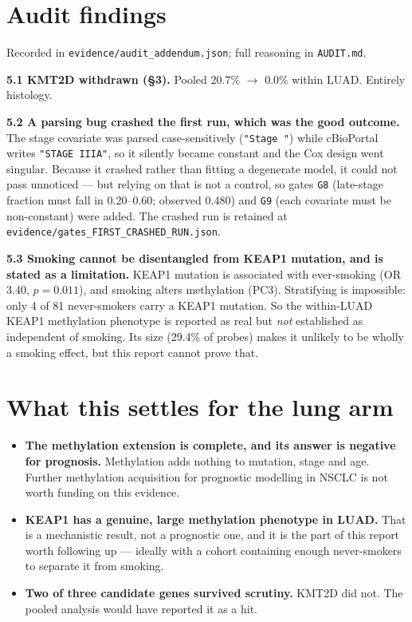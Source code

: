 \documentclass[11pt,a4paper]{article}
\begin{document}
\section{Audit findings}

Recorded in \texttt{evidence/audit\_addendum.json}; full reasoning in \texttt{AUDIT.md}.

\textbf{5.1 KMT2D withdrawn (\S3).} Pooled 20.7\% $\rightarrow$ 0.0\% within LUAD. Entirely
histology.

\textbf{5.2 A parsing bug crashed the first run, which was the good outcome.} The stage
covariate was parsed case-sensitively (\texttt{"Stage "}) while cBioPortal writes
\texttt{"STAGE IIIA"}, so it silently became constant and the Cox design went singular. Because
it crashed rather than fitting a degenerate model, it could not pass unnoticed --- but relying
on that is not a control, so gates \texttt{G8} (late-stage fraction must fall in 0.20--0.60;
observed 0.480) and \texttt{G9} (each covariate must be non-constant) were added. The crashed
run is retained at \texttt{evidence/gates\_FIRST\_CRASHED\_RUN.json}.

\textbf{5.3 Smoking cannot be disentangled from KEAP1 mutation, and is stated as a limitation.}
KEAP1 mutation is associated with ever-smoking (OR 3.40, $p = 0.011$), and smoking alters
methylation (PC3). Stratifying is impossible: only 4 of 81 never-smokers carry a KEAP1
mutation. So the within-LUAD KEAP1 methylation phenotype is reported as real but
\emph{not} established as independent of smoking. Its size (29.4\% of probes) makes it unlikely
to be wholly a smoking effect, but this report cannot prove that.

\section{What this settles for the lung arm}

\begin{itemize}[leftmargin=1.2em,itemsep=2pt]
\item \textbf{The methylation extension is complete, and its answer is negative for prognosis.}
Methylation adds nothing to mutation, stage and age. Further methylation acquisition for
prognostic modelling in NSCLC is not worth funding on this evidence.
\item \textbf{KEAP1 has a genuine, large methylation phenotype in LUAD.} That is a
mechanistic result, not a prognostic one, and it is the part of this report worth following up
--- ideally with a cohort containing enough never-smokers to separate it from smoking.
\item \textbf{Two of three candidate genes survived scrutiny.} KMT2D did not. The pooled
analysis would have reported it as a hit.
\end{itemize}
\end{document}
